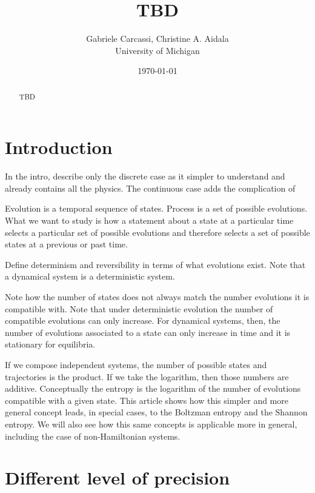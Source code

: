 \documentclass[letterpaper]{article}
\begin{document}
\title{TBD}
\author{Gabriele Carcassi, Christine A. Aidala \\ University of Michigan}

\date{\today}

\maketitle

\begin{abstract}
	TBD
\end{abstract}


\section{Introduction}

In the intro, describe only the discrete case as it simpler to understand and already contains all the physics. The continuous case adds the complication of 

Evolution is a temporal sequence of states. Process is a set of possible evolutions. What we want to study is how a statement about a state at a particular time selects a particular set of possible evolutions and therefore selects a set of possible states at a previous or past time.

Define determinism and reversibility in terms of what evolutions exist. Note that a dynamical system is a deterministic system.

Note how the number of states does not always match the number evolutions it is compatible with. Note that under deterministic evolution the number of compatible evolutions can only increase. For dynamical systems, then, the number of evolutions associated to a state can only increase in time and it is stationary for equilibria.

If we compose independent systems, the number of possible states and trajectories is the product. If we take the logarithm, then those numbers are additive. Conceptually the entropy is the logarithm of the number of evolutions compatible with a given state. This article shows how this simpler and more general concept leads, in special cases, to the Boltzman entropy and the Shannon entropy. We will also see how this same concepts is applicable more in general, including the case of non-Hamiltonian systems.

\section{Different level of precision}
\end{document}
